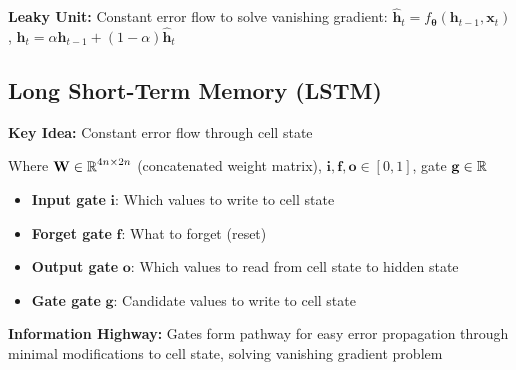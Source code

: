 \textbf{Leaky Unit:} Constant error flow to solve vanishing gradient: {\small $\hat{\mathbf{h}}_t = f_{\mathbf{\theta}}(\mathbf{h}_{t-1}, \mathbf{x}_t)$, $\mathbf{h}_t = \alpha \mathbf{h}_{t-1} + (1-\alpha) \hat{\mathbf{h}}_t$ }

\subsection{Long Short-Term Memory (LSTM)}

\textbf{Key Idea:} Constant error flow through cell state

{ \footnotesize
{}

}

Where $\mathbf{W} \in \operatorname{\mathbb{R}}^{4n \times 2n}$ (concatenated weight matrix), $\mathbf{i}, \mathbf{f}, \mathbf{o} \in [0,1]$, gate $\mathbf{g} \in \operatorname{\mathbb{R}}$


\begin{itemize}
    \item \textbf{Input gate} $\mathbf{i}$: Which values to write to cell state
    \item \textbf{Forget gate} $\mathbf{f}$: What to forget (reset)
    \item \textbf{Output gate} $\mathbf{o}$: Which values to read from cell state to hidden state
    \item \textbf{Gate gate} $\mathbf{g}$: Candidate values to write to cell state
\end{itemize}

\textbf{Information Highway:} Gates form pathway for easy error propagation through minimal modifications to cell state, solving vanishing gradient problem